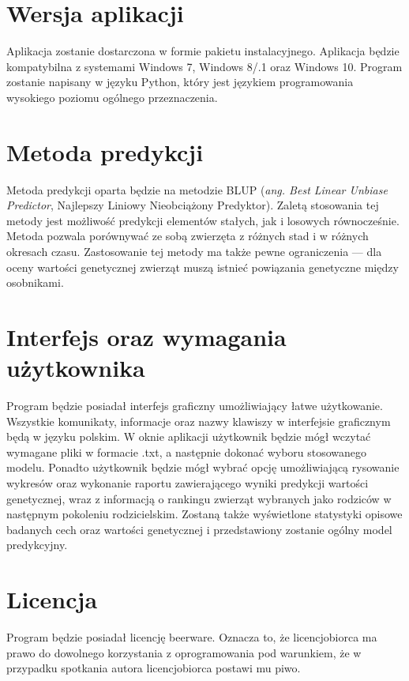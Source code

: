 \documentclass{article}
\begin{document}
\section{Wersja aplikacji}
Aplikacja zostanie dostarczona w formie pakietu instalacyjnego. Aplikacja będzie kompatybilna z systemami Windows 7, Windows 8/.1 oraz Windows 10. Program zostanie napisany w języku Python, który jest językiem programowania wysokiego poziomu ogólnego przeznaczenia.

\section{Metoda predykcji}
Metoda predykcji oparta będzie na metodzie BLUP (\textit{ang. Best Linear Unbiase Predictor}, Najlepszy Liniowy Nieobciążony Predyktor). Zaletą stosowania tej metody jest możliwość predykcji elementów stałych, jak i losowych równocześnie. Metoda pozwala porównywać ze sobą zwierzęta z różnych stad i w różnych okresach czasu. Zastosowanie tej metody ma także pewne ograniczenia --- dla oceny wartości genetycznej zwierząt muszą istnieć powiązania genetyczne między osobnikami.

\section{Interfejs oraz wymagania użytkownika}
Program będzie posiadał interfejs graficzny umożliwiający łatwe użytkowanie. Wszystkie komunikaty, informacje oraz nazwy klawiszy w interfejsie graficznym będą w języku polskim. W oknie aplikacji użytkownik będzie mógł wczytać wymagane pliki w formacie .txt, a następnie dokonać wyboru stosowanego modelu. Ponadto użytkownik będzie mógł wybrać opcję umożliwiającą rysowanie wykresów oraz wykonanie raportu zawierającego wyniki predykcji wartości genetycznej, wraz z informacją o rankingu zwierząt wybranych jako rodziców w następnym pokoleniu rodzicielskim. Zostaną także wyświetlone statystyki opisowe badanych cech oraz wartości genetycznej i przedstawiony zostanie ogólny model predykcyjny.

\section{Licencja}
Program będzie posiadał licencję beerware. Oznacza to, że licencjobiorca ma prawo do dowolnego korzystania z oprogramowania pod warunkiem, że w przypadku spotkania autora licencjobiorca postawi mu piwo.
\end{document}
